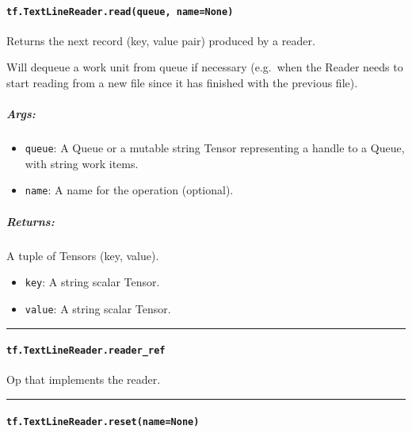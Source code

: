 \paragraph{\texorpdfstring{\texttt{tf.TextLineReader.read(queue,\ name=None)}
}{tf.TextLineReader.read(queue, name=None) }}\label{tf.textlinereader.readqueue-namenone}

Returns the next record (key, value pair) produced by a reader.

Will dequeue a work unit from queue if necessary (e.g.~when the Reader
needs to start reading from a new file since it has finished with the
previous file).

\subparagraph{Args: }\label{args-11}

\begin{itemize}
\tightlist
\item
  \texttt{queue}: A Queue or a mutable string Tensor representing a
  handle to a Queue, with string work items.
\item
  \texttt{name}: A name for the operation (optional).
\end{itemize}

\subparagraph{Returns: }\label{returns-9}

A tuple of Tensors (key, value).

\begin{itemize}
\tightlist
\item
  \texttt{key}: A string scalar Tensor.
\item
  \texttt{value}: A string scalar Tensor.
\end{itemize}

\begin{center}\rule{0.5\linewidth}{\linethickness}\end{center}

\paragraph{\texorpdfstring{\texttt{tf.TextLineReader.reader\_ref}
}{tf.TextLineReader.reader\_ref }}\label{tf.textlinereader.readerux5fref}

Op that implements the reader.

\begin{center}\rule{0.5\linewidth}{\linethickness}\end{center}

\paragraph{\texorpdfstring{\texttt{tf.TextLineReader.reset(name=None)}
}{tf.TextLineReader.reset(name=None) }}\label{tf.textlinereader.resetnamenone}

